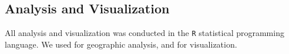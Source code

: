 \documentclass[9pt,twocolumn,twoside]{pnas-new}
\begin{document}
{		\subsection*{Analysis and Visualization} 
		All analysis and visualization was conducted in the \texttt{R} statistical programming language. We used \cite{Bivand2014b,Bivand2014a,Bivand2014} for geographic analysis, and \cite{Wickham} for visualization.
}

\showmatmethods{} %


\showacknow{} %




\end{document}
